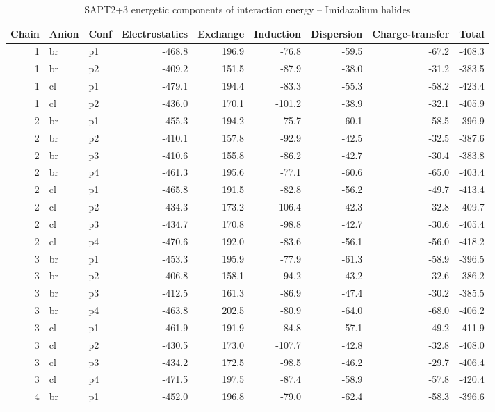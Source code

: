 \documentclass[a4paper]{article}
\begin{document}
\begin{table}[ht]
\centering
\footnotesize
\caption{SAPT2+3 energetic components of interaction energy -- Imidazolium halides}
\begin{tabular}{rllrrrrrr}
  \hline
Chain & Anion & Conf & Electrostatics & Exchange & Induction & Dispersion & Charge-transfer & Total \\ 
  \hline
   1 & br & p1 & -468.8 & 196.9 & -76.8 & -59.5 & -67.2 & -408.3 \\ 
   1 & br & p2 & -409.2 & 151.5 & -87.9 & -38.0 & -31.2 & -383.5 \\ 
   1 & cl & p1 & -479.1 & 194.4 & -83.3 & -55.3 & -58.2 & -423.4 \\ 
   1 & cl & p2 & -436.0 & 170.1 & -101.2 & -38.9 & -32.1 & -405.9 \\ 
   2 & br & p1 & -455.3 & 194.2 & -75.7 & -60.1 & -58.5 & -396.9 \\ 
   2 & br & p2 & -410.1 & 157.8 & -92.9 & -42.5 & -32.5 & -387.6 \\ 
   2 & br & p3 & -410.6 & 155.8 & -86.2 & -42.7 & -30.4 & -383.8 \\ 
   2 & br & p4 & -461.3 & 195.6 & -77.1 & -60.6 & -65.0 & -403.4 \\ 
   2 & cl & p1 & -465.8 & 191.5 & -82.8 & -56.2 & -49.7 & -413.4 \\ 
   2 & cl & p2 & -434.3 & 173.2 & -106.4 & -42.3 & -32.8 & -409.7 \\ 
   2 & cl & p3 & -434.7 & 170.8 & -98.8 & -42.7 & -30.6 & -405.4 \\ 
   2 & cl & p4 & -470.6 & 192.0 & -83.6 & -56.1 & -56.0 & -418.2 \\ 
   3 & br & p1 & -453.3 & 195.9 & -77.9 & -61.3 & -58.9 & -396.5 \\ 
   3 & br & p2 & -406.8 & 158.1 & -94.2 & -43.2 & -32.6 & -386.2 \\ 
   3 & br & p3 & -412.5 & 161.3 & -86.9 & -47.4 & -30.2 & -385.5 \\ 
   3 & br & p4 & -463.8 & 202.5 & -80.9 & -64.0 & -68.0 & -406.2 \\ 
   3 & cl & p1 & -461.9 & 191.9 & -84.8 & -57.1 & -49.2 & -411.9 \\ 
   3 & cl & p2 & -430.5 & 173.0 & -107.7 & -42.8 & -32.8 & -408.0 \\ 
   3 & cl & p3 & -434.2 & 172.5 & -98.5 & -46.2 & -29.7 & -406.4 \\ 
   3 & cl & p4 & -471.5 & 197.5 & -87.4 & -58.9 & -57.8 & -420.4 \\ 
   4 & br & p1 & -452.0 & 196.8 & -79.0 & -62.4 & -58.3 & -396.6 \\ 

\end{tabular}
\end{table}
\end{document}
